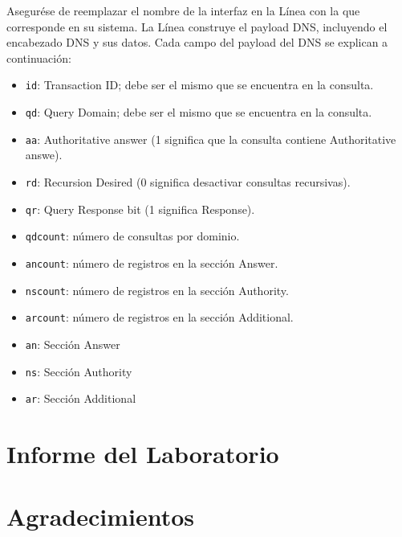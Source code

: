 Asegurése de reemplazar el nombre de la interfaz en la Línea  con la que corresponde en su sistema.
La Línea  construye el payload DNS, incluyendo el encabezado DNS y sus datos. Cada campo del payload del DNS se explican a continuación:

 
\begin{itemize}[noitemsep]
\item \texttt{id}: Transaction ID; debe ser el mismo que se encuentra en la consulta.
\item \texttt{qd}: Query Domain; debe ser el mismo que se encuentra en la consulta.
\item \texttt{aa}: Authoritative answer (1 significa que la consulta contiene Authoritative answe).
\item \texttt{rd}: Recursion Desired (0 significa desactivar consultas recursivas).
\item \texttt{qr}: Query Response bit (1 significa Response).
\item \texttt{qdcount}: número de consultas por dominio.
\item \texttt{ancount}: número de registros en la sección Answer.
\item \texttt{nscount}: número de registros en la sección Authority. 
\item \texttt{arcount}: número de registros en la sección Additional. 
\item \texttt{an}: Sección Answer 
\item \texttt{ns}: Sección Authority
\item \texttt{ar}: Sección Additional
\end{itemize}
  



\section{Informe del Laboratorio}




\section*{Agradecimientos}





